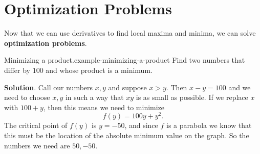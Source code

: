 \documentclass[10pt,]{book}
\newcommand{\terminology}[1]{\textbf{#1}}
\numberwithin{equation}{section}
\begin{document}
\section[{Optimization Problems}]{Optimization Problems}\label{section-optimization-problems}
\hypertarget{p-355}{}%
Now that we can use derivatives to find local maxima and minima, we can solve \terminology{optimization problems}.%
\begin{example}{Minimizing a product.}{example-minimizing-a-product}%
\hypertarget{p-356}{}%
Find two numbers that differ by \(100\) and whose product is a minimum.%
\par\smallskip%
\noindent\textbf{Solution}.\hypertarget{solution-78}{}\quad%
\hypertarget{p-357}{}%
Call our numbers \(x,y\) and suppose \(x > y\). Then \(x-y = 100\) and we need to choose \(x,y\) in such a way that \(xy\) is as small as possible. If we replace \(x\) with \(100+y\), then this means we need to minimize%
\begin{equation*}
f(y) = 100y + y^{2}.
\end{equation*}
The critical point of \(f(y)\) is \(y = -50\), and since \(f\) is a parabola we know that this must be the location of the absolute minimum value on the graph. So the numbers we need are \(50,-50\).%
\end{example}
\end{document}
